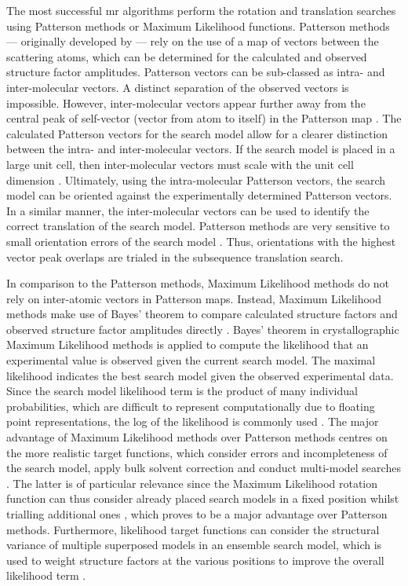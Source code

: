 The most successful \gls{mr} algorithms perform the rotation and translation searches using Patterson methods or Maximum Likelihood functions. Patterson methods --- originally developed by \textcite{Rossmann1962-ou} --- rely on the use of a map of vectors between the scattering atoms, which can be determined for the calculated and observed structure factor amplitudes. Patterson vectors can be sub-classed as intra- and inter-molecular vectors. A distinct separation of the observed vectors is impossible. However, inter-molecular vectors appear further away from the central peak of self-vector (vector from atom to itself) in the Patterson map \cite{Rupp2010-nc}. The calculated Patterson vectors for the search model allow for a clearer distinction between the intra- and inter-molecular vectors. If the search model is placed in a large unit cell, then inter-molecular vectors must scale with the unit cell dimension \cite{Rupp2010-nc}. Ultimately, using the intra-molecular Patterson vectors, the search model can be oriented against the experimentally determined Patterson vectors. In a similar manner, the inter-molecular vectors can be used to identify the correct translation of the search model. Patterson methods are very sensitive to small orientation errors of the search model \cite{Rupp2010-nc}. Thus, orientations with the highest vector peak overlaps are trialed in the subsequence translation search.

In comparison to the Patterson methods, Maximum Likelihood methods do not rely on inter-atomic vectors in Patterson maps. Instead, Maximum Likelihood methods make use of Bayes' theorem \cite{Bayes1763-ox} to compare calculated structure factors and observed structure factor amplitudes directly \cite{Read2001-nu}. Bayes' theorem in crystallographic Maximum Likelihood methods is applied to compute the likelihood that an experimental value is observed given the current search model. The maximal likelihood indicates the best search model given the observed experimental data. Since the search model likelihood term is the product of many individual probabilities, which are difficult to represent computationally due to floating point representations, the log of the likelihood is commonly used \cite{Rupp2010-nc}. The major advantage of Maximum Likelihood methods over Patterson methods centres on the more realistic target functions, which consider errors and incompleteness of the search model, apply bulk solvent correction and conduct multi-model searches \cite{Read2001-nu}. The latter is of particular relevance since the Maximum Likelihood rotation function can thus consider already placed search models in a fixed position whilst trialling additional ones \cite{Storoni2004-ed}, which proves to be a major advantage over Patterson methods.  Furthermore, likelihood target functions can consider the structural variance of multiple superposed models in an ensemble search model, which is used to weight structure factors at the various positions to improve the overall likelihood term \cite{Read2001-nu}. 

